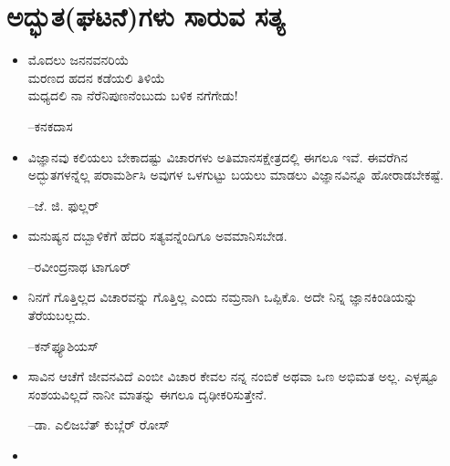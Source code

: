 
\chapter{ಅದ್ಭುತ(ಘಟನೆ)ಗಳು ಸಾರುವ ಸತ್ಯ}

\begin{itemize}
\item ಮೊದಲು ಜನನವನರಿಯೆ\\ಮರಣದ ಹದನ ಕಡೆಯಲಿ ತಿಳಿಯೆ\\ಮಧ್ಯದಲಿ ನಾ ನೆರೆನಿಪುಣನೆಂಬುದು ಬಳಿಕ ನಗೆಗೇಡು!\\
\begin{flushright}
–ಕನಕದಾಸ
\end{flushright}

 \item ವಿಜ್ಞಾನವು ಕಲಿಯಲು ಬೇಕಾದಷ್ಟು ವಿಚಾರಗಳು ಅತಿಮಾನಸಕ್ಷೇತ್ರದಲ್ಲಿ ಈಗಲೂ ಇವೆ. ಈವರೆಗಿನ ಅದ್ಭುತಗಳನ್ನೆಲ್ಲ ಪರಾಮರ್ಶಿಸಿ ಅವುಗಳ ಒಳಗುಟ್ಟು ಬಯಲು ಮಾಡಲು ವಿಜ್ಞಾನವಿನ್ನೂ ಹೋರಾಡಬೇಕಷ್ಟೆ.\\
\begin{flushright}
–ಜೆ. ಜಿ. ಫುಲ್ಲರ್​
\end{flushright}

 \item ಮನುಷ್ಯನ ದಬ್ಬಾಳಿಕೆಗೆ ಹೆದರಿ ಸತ್ಯವನ್ನೆಂದಿಗೂ ಅವಮಾನಿಸಬೇಡ.\\
\begin{flushright}
–ರವೀಂದ್ರನಾಥ ಟಾಗೂರ್​
\end{flushright}

 \item ನಿನಗೆ ಗೊತ್ತಿಲ್ಲದ ವಿಚಾರವನ್ನು ಗೊತ್ತಿಲ್ಲ ಎಂದು ನಮ್ರನಾಗಿ ಒಪ್ಪಿಕೊ. ಅದೇ ನಿನ್ನ ಜ್ಞಾನಕಿಂಡಿಯನ್ನು ತೆರೆಯಬಲ್ಲದು.\\
\begin{flushright}
–ಕನ್​ಫ್ಯೂಶಿಯಸ್​
\end{flushright}

 \item ಸಾವಿನ ಆಚೆಗೆ ಜೀವನವಿದೆ ಎಂಬೀ ವಿಚಾರ ಕೇವಲ ನನ್ನ ನಂಬಿಕೆ ಅಥವಾ ಒಣ ಅಭಿಮತ ಅಲ್ಲ. ಎಳ್ಳಷ್ಟೂ ಸಂಶಯವಿಲ್ಲದೆ ನಾನೀ ಮಾತನ್ನು ಈಗಲೂ ದೃಢೀಕರಿಸುತ್ತೇನೆ.\\
\begin{flushright}
–ಡಾ. ಎಲಿಜಬೆತ್ ಕುಬ್ಲೆರ್ ರೋಸ್
\end{flushright}

 \item {}\\
\begin{flushright}
\end{flushright}


\end{itemize}
